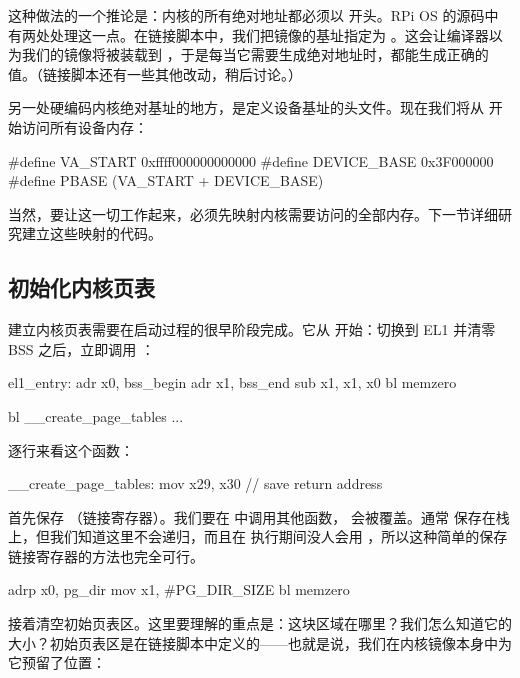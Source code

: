 这种做法的一个推论是：内核的所有绝对地址都必须以  开头。RPi OS 的源码中有两处处理这一点。在链接脚本中，我们把镜像的基址指定为 。这会让编译器以为我们的镜像将被装载到 ，于是每当它需要生成绝对地址时，都能生成正确的值。（链接脚本还有一些其他改动，稍后讨论。）

另一处硬编码内核绝对基址的地方，是定义设备基址的头文件。现在我们将从  开始访问所有设备内存：

\begin{ccode}
#define VA_START        0xffff000000000000
#define DEVICE_BASE     0x3F000000
#define PBASE           (VA_START + DEVICE_BASE)
\end{ccode}

当然，要让这一切工作起来，必须先映射内核需要访问的全部内存。下一节详细研究建立这些映射的代码。

\subsection{初始化内核页表}

建立内核页表需要在启动过程的很早阶段完成。它从  开始：切换到 EL1 并清零 BSS 之后，立即调用 ：

\begin{asmcode}
el1_entry:
	adr	x0, bss_begin
	adr	x1, bss_end
	sub	x1, x1, x0
	bl 	memzero

	bl 	__create_page_tables
	...
\end{asmcode}

逐行来看这个函数：

\begin{asmcode}
__create_page_tables:
	mov	x29, x30						// save return address
\end{asmcode}

首先保存 （链接寄存器）。我们要在  中调用其他函数， 会被覆盖。通常  保存在栈上，但我们知道这里不会递归，而且在  执行期间没人会用 ，所以这种简单的保存链接寄存器的方法也完全可行。

\begin{asmcode}
	adrp	x0, pg_dir
	mov	x1, #PG_DIR_SIZE
	bl 	memzero
\end{asmcode}

接着清空初始页表区。这里要理解的重点是：这块区域在哪里？我们怎么知道它的大小？初始页表区是在链接脚本中定义的——也就是说，我们在内核镜像本身中为它预留了位置：

